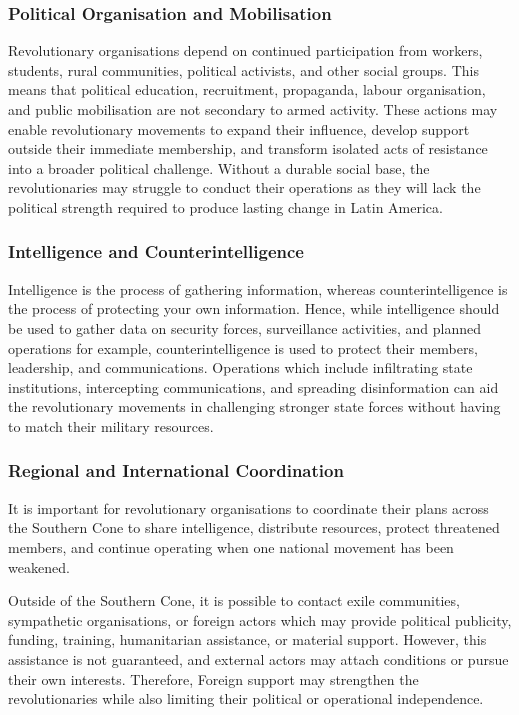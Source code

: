 \subsubsection{Political Organisation and Mobilisation}

Revolutionary organisations depend on continued participation from workers, students, rural communities, political activists, and other social groups. This means that political education, recruitment, propaganda, labour organisation, and public mobilisation are not secondary to armed activity. These actions may enable revolutionary movements to expand their influence, develop support outside their immediate membership, and transform isolated acts of resistance into a broader political challenge. Without a durable social base, the revolutionaries may struggle to conduct their operations as they will lack the political strength required to produce lasting change in Latin America.

\subsubsection{Intelligence and Counterintelligence}

Intelligence is the process of gathering information, whereas counterintelligence is the process of protecting your own information. Hence, while intelligence should be used to gather data on security forces, surveillance activities, and planned operations for example, counterintelligence is used to protect their members, leadership, and communications. Operations which include infiltrating state institutions, intercepting communications, and spreading disinformation can aid the revolutionary movements in challenging stronger state forces without having to match their military resources.

\subsubsection{Regional and International Coordination}

It is important for revolutionary organisations to coordinate their plans across the Southern Cone to share intelligence, distribute resources, protect threatened members, and continue operating when one national movement has been weakened.

Outside of the Southern Cone, it is possible to contact exile communities, sympathetic organisations, or foreign actors which may provide political publicity, funding, training, humanitarian assistance, or material support. However, this assistance is not guaranteed, and external actors may attach conditions or pursue their own interests. Therefore, Foreign support may strengthen the revolutionaries while also limiting their political or operational independence.

